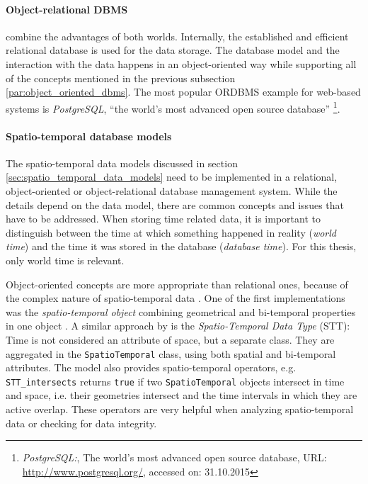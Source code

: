 

\paragraph{Object-relational DBMS} %
\label{par:object_relational_dbms}

combine the advantages of both worlds. Internally, the established and efficient relational database is used for the data storage. The database model and the interaction with the data happens in an object-oriented way while supporting all of the concepts mentioned in the previous subsection \ref{par:object_oriented_dbms}. The most popular ORDBMS example for web-based systems is \emph{PostgreSQL}, ``the world's most advanced open source database''
\footnote{
  \emph{PostgreSQL:},
  The world's most advanced open source database,
  URL: \url{http://www.postgresql.org/},
  accessed on: 31.10.2015
}.



\paragraph{Spatio-temporal database models} %
\label{par:spatio_temporal_database_models}

The spatio-temporal data models discussed in section \ref{sec:spatio_temporal_data_models} need to be implemented in a relational, object-oriented or object-relational database management system. While the details depend on the data model, there are common concepts and issues that have to be addressed. When storing time related data, it is important to distinguish between the time at which something happened in reality (\emph{world time}) and the time it was stored in the database (\emph{database time}). For this thesis, only world time is relevant.

Object-oriented concepts are more appropriate than relational ones, because of the complex nature of spatio-temporal data \cite[section 3.9]{pelekis04stdms}. One of the first implementations was the \emph{spatio-temporal object} combining geometrical and bi-temporal properties in one object \cite{worboys90stdm}. A similar approach by \cite{raza12} is the \emph{Spatio-Temporal Data Type} (STT): Time is not considered an attribute of space, but a separate class. They are aggregated in the \texttt{SpatioTemporal} class, using both spatial and bi-temporal attributes. The model also provides spatio-temporal operators, e.g. \texttt{STT\_intersects} returns \texttt{true} if two \texttt{SpatioTemporal} objects intersect in time and space, i.e. their geometries intersect and the time intervals in which they are active overlap. These operators are very helpful when analyzing spatio-temporal data or checking for data integrity.


